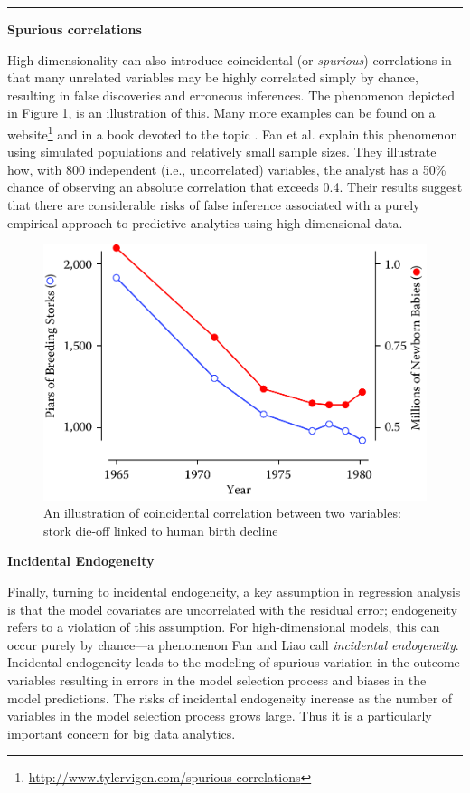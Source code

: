 \documentclass[]{krantz}
\begin{document}
\begin{center}\rule{0.5\linewidth}{\linethickness}\end{center}

\textbf{Spurious correlations}

High dimensionality can also introduce coincidental (or \emph{spurious})
correlations in that many unrelated variables may be highly correlated
simply by chance, resulting in false discoveries and erroneous
inferences. The phenomenon depicted in Figure \ref{fig:fig10-3}, is an
illustration of this. Many more examples can be found on a
website\footnote{\url{http://www.tylervigen.com/spurious-correlations}}
and in a book devoted to the topic \citep{spurious2}. Fan et al.
\citeyearpar{fan2014challenges} explain this phenomenon using simulated
populations and relatively small sample sizes. They illustrate how, with
800 independent (i.e., uncorrelated) variables, the analyst has a 50\%
chance of observing an absolute correlation that exceeds 0.4. Their
results suggest that there are considerable risks of false inference
associated with a purely empirical approach to predictive analytics
using high-dimensional data.

\begin{figure}

{\centering \includegraphics[width=0.7\linewidth]{ChapterError/figures/fig10-3} 

}

\caption{An illustration of coincidental correlation between two variables: stork die-off linked to human birth decline \citep{sies1988new}}\label{fig:fig10-3}
\end{figure}

\textbf{Incidental Endogeneity}

Finally, turning to incidental endogeneity, a key assumption in
regression analysis is that the model covariates are uncorrelated with
the residual error; endogeneity refers to a violation of this
assumption. For high-dimensional models, this can occur purely by
chance---a phenomenon Fan and Liao \citeyearpar{fan2014endogeneity} call
\emph{incidental endogeneity}. Incidental endogeneity leads to the
modeling of spurious variation in the outcome variables resulting in
errors in the model selection process and biases in the model
predictions. The risks of incidental endogeneity increase as the number
of variables in the model selection process grows large. Thus it is a
particularly important concern for big data analytics.
\end{document}
